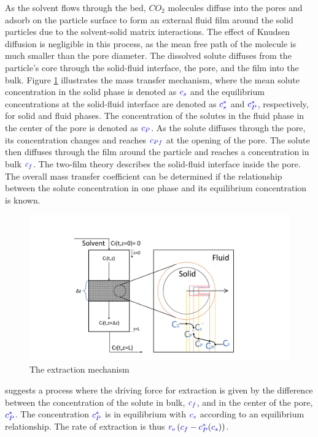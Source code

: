 \documentclass[../Article_Model_Parameters.tex]{subfiles}
\begin{document}
	As the solvent flows through the bed, $CO_2$ molecules diffuse into the pores and adsorb on the particle surface to form an external fluid film around the solid particles due to the solvent-solid matrix interactions. The effect of Knudsen diffusion is negligible in this process, as the mean free path of the molecule is much smaller than the pore diameter. The dissolved solute diffuses from the particle's core through the solid-fluid interface, the pore, and the film into the bulk. Figure \ref{fig: SFE_Mechanism} illustrates the mass transfer mechanism, where the mean solute concentration in the solid phase is denoted as ${\color{blue}c_s}$ and the equilibrium concentrations at the solid-fluid interface are denoted as ${\color{blue}c_s^*}$ and ${\color{blue}c_P^*}$, respectively, for solid and fluid phases. The concentration of the solutes in the fluid phase in the center of the pore is denoted as ${\color{blue}c_{P}}$. As the solute diffuses through the pore, its concentration changes and reaches ${\color{blue}c_{Pf}}$ at the opening of the pore. The solute then diffuses through the film around the particle and reaches a concentration in bulk ${\color{blue}c_f}$. The two-film theory describes the solid-fluid interface inside the pore. The overall mass transfer coefficient can be determined if the relationship between the solute concentration in one phase and its equilibrium concentration is known.
			
		\begin{figure}[h!]
			\centering
			\includegraphics[trim = 5.8cm 1.1cm 6cm 3cm,clip,width=\columnwidth]{Figures/SFE_draft.pdf}	
			\caption{The extraction mechanism}
			\label{fig: SFE_Mechanism}
		\end{figure}
			
		\citet{Bulley1984} suggests a process where the driving force for extraction is given by the difference between the concentration of the solute in bulk, ${\color{blue}c_f}$, and in the center of the pore, ${\color{blue}c_P^*}$. The concentration ${\color{blue}c_P^*}$ is in equilibrium with ${\color{blue}c_s}$ according to an equilibrium relationship. The rate of extraction is thus ${\color{blue}r_\text{e}}\left({\color{blue}c_f} - {\color{blue}c^*_P}({\color{blue}c_s})\right)$.  
			
\end{document}
